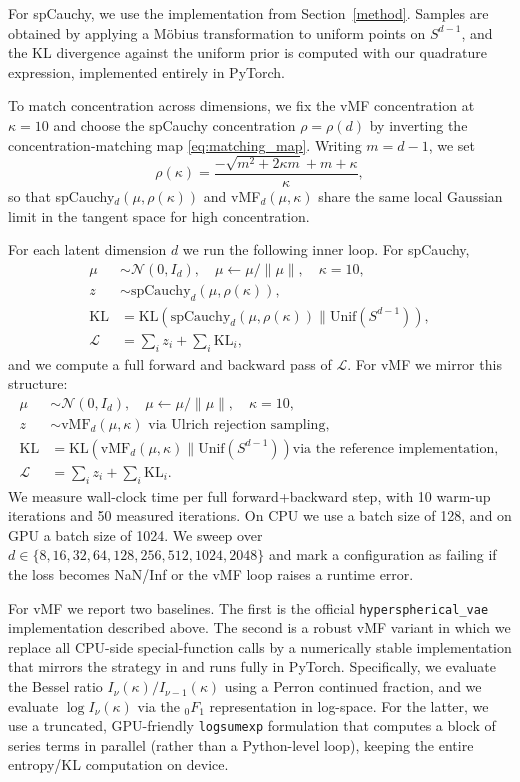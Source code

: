 \documentclass{article}
\begin{document}
For spCauchy, we use the implementation from Section~\ref{method}. Samples are obtained by applying a Möbius transformation to uniform points on $S^{d-1}$, and the KL divergence against the uniform prior is computed with our quadrature expression, implemented entirely in PyTorch.

To match concentration across dimensions, we fix the vMF concentration at $\kappa=10$ and choose the spCauchy concentration $\rho=\rho(d)$ by inverting the concentration-matching map \eqref{eq:matching_map}. Writing $m=d-1$, we set
\[
\rho(\kappa) = \frac{-\sqrt{m^2 + 2\kappa m} + m + \kappa}{\kappa},
\]
so that spCauchy$_d(\mu,\rho(\kappa))$ and vMF$_d(\mu,\kappa)$ share the same local Gaussian limit in the tangent space for high concentration.

For each latent dimension $d$ we run the following inner loop.
For spCauchy,
\begin{align*}
  \mu &\sim \mathcal{N}(0, I_d), \quad \mu \leftarrow \mu / \|\mu\|, \quad
  \kappa = 10, \\
  z &\sim \mathrm{spCauchy}_d(\mu, \rho(\kappa)), \\
  \mathrm{KL} &= \mathrm{KL}\left(\mathrm{spCauchy}_d(\mu,\rho(\kappa)) \| \mathrm{Unif}(S^{d-1})\right), \\
  \mathcal{L} &= \sum_i z_i + \sum_i \mathrm{KL}_i,
\end{align*}
and we compute a full forward and backward pass of $\mathcal{L}$. For vMF we mirror this structure:
\begin{align*}
  \mu &\sim \mathcal{N}(0, I_d), \quad \mu \leftarrow \mu / \|\mu\|, \quad
  \kappa = 10, \\
  z &\sim \mathrm{vMF}_d(\mu, \kappa) \text{ via Ulrich rejection sampling}, \\
  \mathrm{KL} &= \mathrm{KL}\left(\mathrm{vMF}_d(\mu,\kappa) \| \mathrm{Unif}(S^{d-1})\right)
               \text{via the reference implementation}, \\
  \mathcal{L} &= \sum_i z_i + \sum_i \mathrm{KL}_i.
\end{align*}
We measure wall-clock time per full forward+backward step, with 10 warm-up iterations and 50 measured iterations. On CPU we use a batch size of 128, and on GPU a batch size of 1024. We sweep over $d \in \{8,16,32,64,128,256,512,1024,2048\}$ and mark a configuration as failing if the loss becomes NaN/Inf or the vMF loop raises a runtime error.

For vMF we report two baselines. The first is the official \texttt{hyperspherical\_vae} implementation described above. The second is a robust vMF variant in which we replace all CPU-side special-function calls by a numerically stable implementation that mirrors the strategy in \cite{movMF} and runs fully in PyTorch. Specifically, we evaluate the Bessel ratio $I_{\nu}(\kappa)/I_{\nu-1}(\kappa)$ using a Perron continued fraction, and we evaluate $\log I_{\nu}(\kappa)$ via the ${}_0F_1$ representation in log-space. For the latter, we use a truncated, GPU-friendly \texttt{logsumexp} formulation that computes a block of series terms in parallel (rather than a Python-level loop), keeping the entire entropy/KL computation on device.
\end{document}
